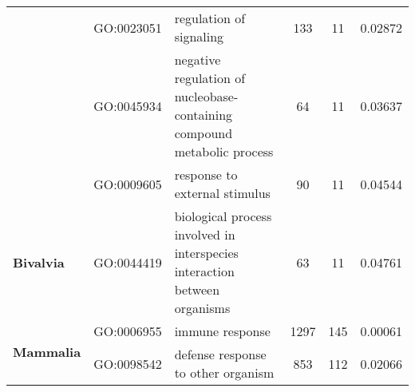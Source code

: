 \begin{landscape}
\begin{longtable}[c]{@{}lllccr@{}}
		                                               & GO:0023051                         & regulation of signaling                                                   & 133                                                                & 11                                                                   & 0.02872                                                                                  \\
		                                               & GO:0045934                         & negative regulation of nucleobase-containing compound metabolic process   & 64                                                                 & 11                                                                   & 0.03637                                                                                  \\
		                                               & GO:0009605                         & response to external stimulus                                             & 90                                                                 & 11                                                                   & 0.04544                                                                                  \\
		\multirow{1}{*}{\textbf{Bivalvia}}             & GO:0044419                         & biological process involved in interspecies interaction between organisms & 63                                                                 & 11                                                                   & 0.04761                                                                                  \\* \midrule
		\multirow{22}{*}{\textbf{Mammalia}}            & GO:0006955                         & immune response                                                           & 1297                                                               & 145                                                                  & 0.00061                                                                                  \\
		                                               & GO:0098542                         & defense response to other organism                                        & 853                                                                & 112                                                                  & 0.02066                                                                                  \\

\end{longtable}
\end{landscape}
